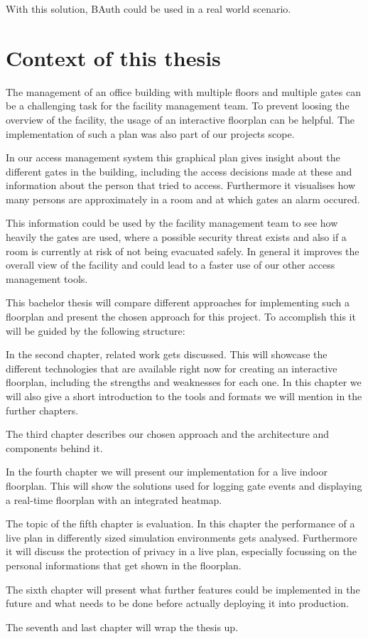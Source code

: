 With this solution, BAuth could be used in a real world scenario.

\section{Context of this thesis}
\label{Context of this thesis}

The management of an office building with multiple floors and multiple gates can be a challenging task for the facility management team. To prevent loosing the overview of the facility, the usage of an interactive floorplan can be helpful. The implementation of such a plan was also part of our projects scope.

In our access management system this graphical plan gives insight about the different gates in the building, including the access decisions made at these and information about the person that tried to access. Furthermore it visualises how many persons are approximately in a room and at which gates an alarm occured. 

This information could be used by the facility management team to see how heavily the gates are used, where a possible security threat exists and also if a room is currently at risk of not being evacuated safely. 
In general it improves the overall view of the facility and could lead to a faster use of our other access management tools.

This bachelor thesis will compare different approaches for implementing such a floorplan and present the chosen approach for this project. To accomplish this it will be guided by the following structure:

In the second chapter, related work gets discussed. This will showcase the different technologies that are available right now for creating an interactive floorplan, including the strengths and weaknesses for each one. In this chapter we will also give a short introduction to the tools and formats we will mention in the further chapters.

The third chapter describes our chosen approach and the architecture and components behind it.

In the fourth chapter we will present our implementation for a live indoor floorplan. This will show the solutions used for logging gate events and displaying a real-time floorplan with an integrated heatmap.

The topic of the fifth chapter is evaluation. In this chapter the performance of a live plan in differently sized simulation environments gets analysed. Furthermore it will discuss the protection of privacy in a live plan, especially focussing on the personal informations that get shown in the floorplan.

The sixth chapter will present what further features could be implemented in the future and what needs to be done before actually deploying it into production. 

The seventh and last chapter will wrap the thesis up.